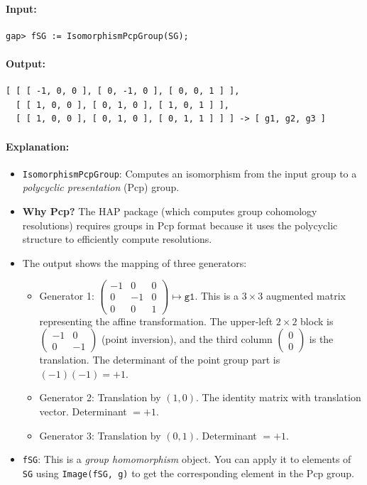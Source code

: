 \documentclass{SciPost}
\begin{document}
\paragraph{Input:}
\begin{verbatim}
gap> fSG := IsomorphismPcpGroup(SG);
\end{verbatim}

\paragraph{Output:}
\begin{verbatim}
[ [ [ -1, 0, 0 ], [ 0, -1, 0 ], [ 0, 0, 1 ] ], 
  [ [ 1, 0, 0 ], [ 0, 1, 0 ], [ 1, 0, 1 ] ], 
  [ [ 1, 0, 0 ], [ 0, 1, 0 ], [ 0, 1, 1 ] ] ] -> [ g1, g2, g3 ]
\end{verbatim}

\paragraph{Explanation:}
\begin{itemize}
    \item \texttt{IsomorphismPcpGroup}: Computes an isomorphism from the input group to a \textit{polycyclic presentation} (Pcp) group.
    \item \textbf{Why Pcp?} The HAP package (which computes group cohomology resolutions) requires groups in Pcp format because it uses the polycyclic structure to efficiently compute resolutions.
    \item The output shows the mapping of three generators:
    \begin{itemize}
        \item Generator 1: $\begin{pmatrix} -1 & 0 & 0 \\ 0 & -1 & 0 \\ 0 & 0 & 1 \end{pmatrix} \mapsto \texttt{g1}$. This is a $3\times 3$ augmented matrix representing the affine transformation. The upper-left $2\times 2$ block is $\begin{pmatrix} -1 & 0 \\ 0 & -1 \end{pmatrix}$ (point inversion), and the third column $\begin{pmatrix} 0 \\ 0 \end{pmatrix}$ is the translation. The determinant of the point group part is $(-1)(-1) = +1$.
        \item Generator 2: Translation by $(1, 0)$. The identity matrix with translation vector. Determinant $= +1$.
        \item Generator 3: Translation by $(0, 1)$. Determinant $= +1$.
    \end{itemize}
    \item \texttt{fSG}: This is a \textit{group homomorphism} object. You can apply it to elements of \texttt{SG} using \texttt{Image(fSG, g)} to get the corresponding element in the Pcp group.
\end{itemize}
\end{document}
